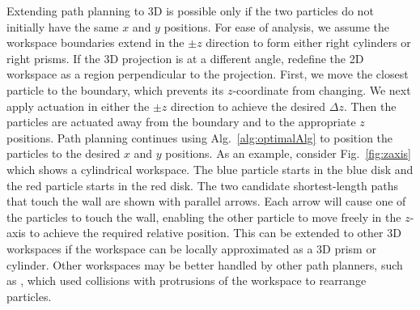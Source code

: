 Extending path planning to 3D is possible only if the two particles do not initially have the same $x$ and $y$ positions.
For ease of analysis, we assume the workspace boundaries extend in the $\pm z$ direction to form either right cylinders or right prisms.
If the 3D projection is at a different angle, redefine the 2D workspace as a region perpendicular to the projection.
 First, we move the closest particle to the boundary, which prevents its $z$-coordinate from changing.  
 We next apply actuation in either the $\pm z$ direction to achieve the desired $\Delta z$.
 Then the particles are actuated away from the boundary and to the appropriate $z$ positions.
 Path planning continues using Alg.~\ref{alg:optimalAlg} to position the particles to the desired $x$ and $y$ positions. 
 As an example, consider Fig.~\ref{fig:zaxis} which shows a cylindrical workspace.
 The blue particle starts in the blue disk and the red particle starts in the red disk. 
 The two candidate shortest-length paths that touch the wall are shown with parallel arrows. 
Each arrow will cause one of the particles to touch the wall, enabling the other particle to move freely in the  $z$-axis to achieve the required relative position.
This can be extended to other 3D workspaces if the workspace can be locally approximated as a 3D prism or cylinder. Other workspaces may be better handled by other path planners, such as \cite{AaronManipulation2013}, which used  collisions with  protrusions of the workspace to rearrange particles.








